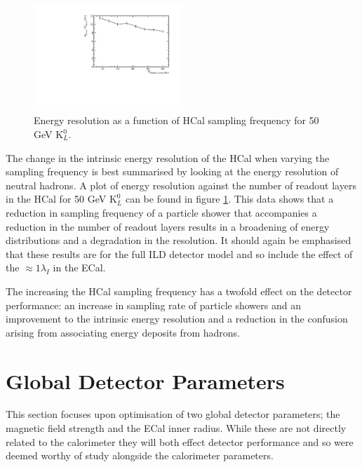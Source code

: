 \begin{figure}
\centering
\includegraphics[width=0.5\textwidth]{OptimisationStudies/Plots/EnergyResolution/ER_vs_NHCalVariableLayers_50GeVKaon0L.pdf}
\caption[Energy resolution as a function of HCal sampling frequency for 50 GeV $\text{K}^{0}_{L}$.]{Energy resolution as a function of HCal sampling frequency for 50 GeV $\text{K}^{0}_{L}$.}
\label{fig:hcalnlayers}
\end{figure}

The change in the intrinsic energy resolution of the HCal when varying the sampling frequency is best summarised by looking at the energy resolution of neutral hadrons.  A plot of energy resolution against the number of readout layers in the HCal for 50 GeV $\text{K}^{0}_{L}$ can be found in figure \ref{fig:hcalnlayers}.  This data shows that a reduction in sampling frequency of a particle shower that accompanies a reduction in the number of readout layers results in a broadening of energy distributions and a degradation in the resolution.  It should again be emphasised that these results are for the full ILD detector model and so include the effect of the $\approx 1 \lambda_{I}$ in the ECal.  

The increasing the HCal sampling frequency has a twofold effect on the detector performance: an increase in sampling rate of particle showers and an improvement to the intrinsic energy resolution and a reduction in the confusion arising from associating energy deposits from hadrons.  


\section{Global Detector Parameters}
This section focuses upon optimisation of two global detector parameters; the magnetic field strength and the ECal inner radius.  While these are not directly related to the calorimeter they will both effect detector performance and so were deemed worthy of study alongside the calorimeter parameters. 

